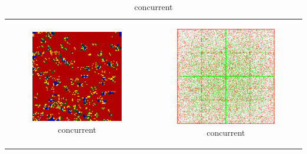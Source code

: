 \begin{table}
\begin{tabular}{c c}
		\begin{subfigure}[b]{0.4\textwidth}
			\centering
			\includegraphics[width=.7\textwidth, angle=0]{./fig/con_99x99_436steps_MSG_haskell.png}
			\caption{concurrent}
			\label{fig:pd_con}
		\end{subfigure}
    	&
		\begin{subfigure}[b]{0.4\textwidth}
			\centering
			\includegraphics[width=.7\textwidth, angle=0]{./fig/con_HAC_100_000_500steps_java.png}
			\caption{concurrent}
			\label{fig:hac_con}
		\end{subfigure}
    	\\ 
    	
		

\end{tabular}
\end{table}
